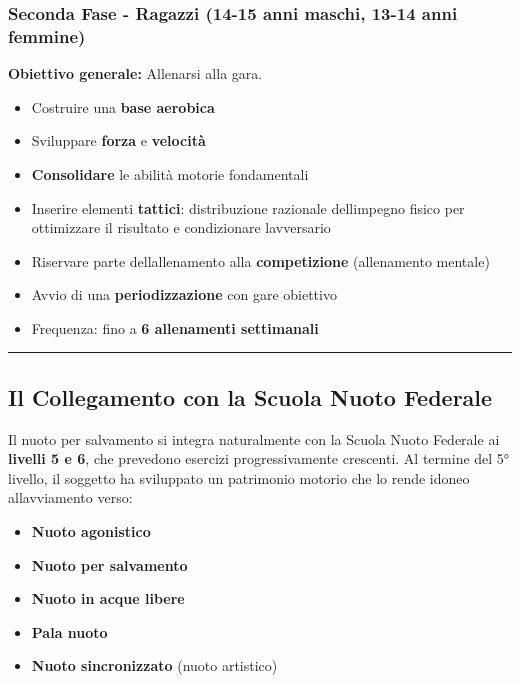 \documentclass[a4paper,11pt]{article}
\providecommand{\tightlist}{%
  \setlength{\itemsep}{0pt}\setlength{\parskip}{0pt}}
\begin{document}
\subsubsection{Seconda Fase - Ragazzi (14-15 anni maschi, 13-14 anni
      femmine)}\label{seconda-fase---ragazzi-14-15-anni-maschi-13-14-anni-femmine}

\textbf{Obiettivo generale:} Allenarsi alla gara.

\begin{itemize}
      \tightlist
      \item
            Costruire una \textbf{base aerobica}
      \item
            Sviluppare \textbf{forza} e \textbf{velocità}
      \item
            \textbf{Consolidare} le abilità motorie fondamentali
      \item
            Inserire elementi \textbf{tattici}: distribuzione razionale
            dell\textquotesingle impegno fisico per ottimizzare il risultato e
            condizionare l\textquotesingle avversario
      \item
            Riservare parte dell\textquotesingle allenamento alla
            \textbf{competizione} (allenamento mentale)
      \item
            Avvio di una \textbf{periodizzazione} con gare obiettivo
      \item
            Frequenza: fino a \textbf{6 allenamenti settimanali}
\end{itemize}

\begin{center}\rule{0.5\linewidth}{0.5pt}\end{center}

\subsection{Il Collegamento con la Scuola Nuoto
      Federale}\label{il-collegamento-con-la-scuola-nuoto-federale}

Il nuoto per salvamento si integra naturalmente con la Scuola Nuoto
Federale ai \textbf{livelli 5 e 6}, che prevedono esercizi
progressivamente crescenti. Al termine del 5° livello, il soggetto ha
sviluppato un patrimonio motorio che lo rende idoneo
all\textquotesingle avviamento verso:

\begin{itemize}
      \tightlist
      \item
            \textbf{Nuoto agonistico}
      \item
            \textbf{Nuoto per salvamento}
      \item
            \textbf{Nuoto in acque libere}
      \item
            \textbf{Pala nuoto}
      \item
            \textbf{Nuoto sincronizzato} (nuoto artistico)
\end{itemize}
\end{document}
